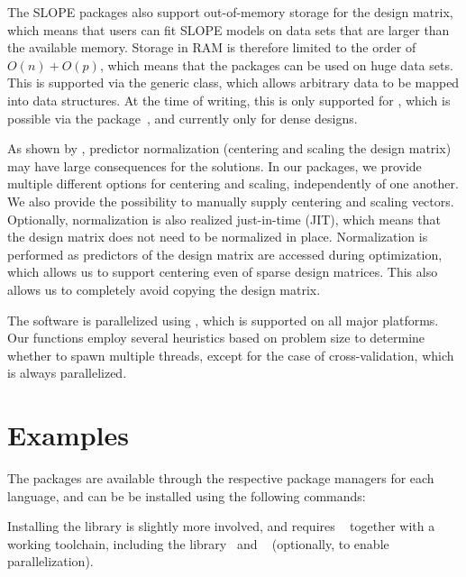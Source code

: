 \documentclass[article]{jss}
\begin{document}
The SLOPE packages also support out-of-memory storage for the design matrix, which
means that users can fit SLOPE models on data sets that are larger than the
available memory. Storage in RAM is therefore limited to the order of \(O(n) +
O(p)\), which means that the packages can be used on huge data sets.
This is supported via the generic  class, which allows
arbitrary data to be mapped into  data structures. At the
time of writing, this is only supported for ,
which is possible via the  package~\citep{kane2013},
and currently only for dense designs.

As shown by \citet{larsson2025}, predictor normalization (centering and
scaling the design matrix) may have large consequences for the
solutions. In our packages, we provide multiple different options
for centering and scaling, independently of one another.
We also provide the possibility to manually supply centering
and scaling vectors. Optionally, normalization is also realized just-in-time (JIT),
which means that the design matrix does not need to be normalized in place.
Normalization is performed as predictors of the design matrix are accessed during
optimization, which allows us to support centering even of sparse design
matrices. This also allows us to completely avoid copying the design matrix.

The software is parallelized using , which is supported on all
major platforms. Our functions employ several heuristics based on problem size to
determine whether to spawn multiple threads, except
for the case of cross-validation, which is always parallelized.

\section{Examples}\label{sec:examples}

The packages are
available through the respective package managers for each language, and can be
be installed using the following commands:
\begin{description}[labelwidth=8ex]
  \item[\proglang{R}] 
  \item[\proglang{Python}] 
  \item[\proglang{Julia}] 
\end{description}

Installing the  library is slightly more involved, and requires
~\citep{kitware2025} together with a working  toolchain, including
the  library~\citep{guennebaud2010a} and ~\citep{dagum1998} (optionally,
to enable parallelization).
\end{document}
